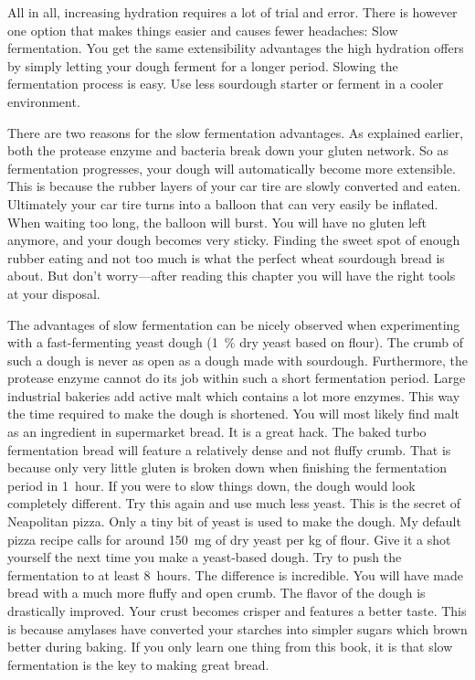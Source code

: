 All in all, increasing hydration requires a lot of trial and error. There
is however one option that makes things easier and causes fewer headaches:
Slow fermentation. You get the same extensibility advantages the high hydration
offers by simply letting your dough ferment for a longer period.
Slowing the fermentation process is easy. Use less
sourdough starter or ferment in a cooler environment.

There are two reasons for the slow fermentation advantages.  As explained
earlier, both the protease enzyme and bacteria break down your gluten network.
So as fermentation progresses, your dough will automatically become more
extensible. This is because the rubber layers of your car tire are slowly
converted and eaten. Ultimately your car tire turns into a balloon that can
very easily be inflated. When waiting too long, the balloon will burst. You
will have no gluten left anymore, and your dough becomes very sticky. Finding
the sweet spot of enough rubber eating and not too much is what the perfect
wheat sourdough bread is about. But don't worry---after reading this chapter
you will have the right tools at your disposal.

The advantages of slow fermentation can be nicely observed when experimenting
with a fast-fermenting yeast dough (\qty{1}{\percent} dry yeast based on flour). The
crumb of such a dough is never as
open as a dough made with sourdough. Furthermore, the protease enzyme
cannot do its job within such a short fermentation period.
Large industrial bakeries add active malt which contains a
lot more enzymes. This way the time required to make the dough is shortened. You
will most likely find malt as an ingredient in supermarket bread. It is a
great hack. The baked turbo fermentation bread will feature a relatively dense
and not fluffy crumb. That is because only very little gluten is broken down when
finishing the fermentation period in 1~hour. If you were to slow things down,
the dough would look completely different.
Try this again and use much less yeast. This is the
secret of Neapolitan pizza. Only a tiny bit of yeast is used to make the
dough. My default pizza recipe calls for around \qty{150}{\mg} of dry
yeast per \unit{\kg} of flour. Give it a shot yourself the next time you
make a yeast-based dough. Try to push the fermentation to at least 8~hours.
The difference is incredible. You will have made bread with a much more
fluffy and open crumb. The flavor of the dough is drastically improved. Your
crust becomes crisper and features a better taste. This is because amylases have
converted your starches into simpler sugars which brown better during baking.
If you only learn one thing from this book, it is that slow fermentation is
the key to making great bread.

